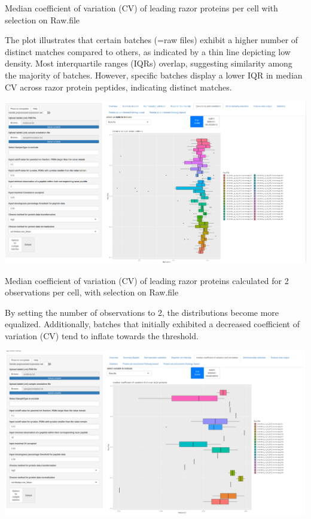 \documentclass[
  11pt,
]{article}
\let\origfigure\figure
\begin{document}
\caption{Median coefficient of variation (CV) of leading razor proteins per cell with selection on Raw.file}\label{fig:ui_cv_rawfile_default}
 \endfigure\egroup

The plot illustrates that certain batches (=raw files) exhibit a higher
number of distinct matches compared to others, as indicated by a thin
line depicting low density. Most interquartile ranges (IQRs) overlap,
suggesting similarity among the majority of batches. However, specific
batches display a lower IQR in median CV across razor protein peptides,
indicating distinct matches.

\newpage
\bgroup  \origfigure[H] 

{\centering \includegraphics[width=1\linewidth]{screenshots/cv_rawfile_nobs2} 

}

\caption{Median coefficient of variation (CV) of leading razor proteins calculated for 2  observations per cell, with selection on Raw.file}\label{fig:ui_cv_rawfile_nobs2}
 \endfigure\egroup

By setting the number of observations to 2, the distributions become
more equalized. Additionally, batches that initially exhibited a
decreased coefficient of variation (CV) tend to inflate towards the
threshold.

\newpage
\bgroup  \origfigure[H] 

{\centering \includegraphics[width=1\linewidth]{screenshots/cv_rawfile_nobs10} 

}
\end{document}
